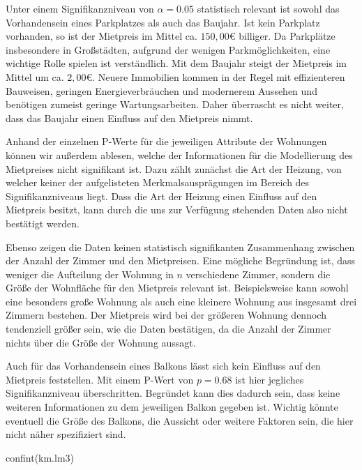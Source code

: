 \documentclass[
  a4paper,
  DIV=11]{scrartcl}
\newenvironment{Shaded}{\begin{snugshade}}{\end{snugshade}}
\newcommand{\FunctionTok}[1]{\textcolor[rgb]{0.28,0.35,0.67}{#1}}
\newcommand{\NormalTok}[1]{\textcolor[rgb]{0.00,0.23,0.31}{#1}}
\begin{document}
Unter einem Signifikanzniveau von \(\alpha = 0.05\) statistisch relevant
ist sowohl das Vorhandensein eines Parkplatzes als auch das Baujahr. Ist
kein Parkplatz vorhanden, so ist der Mietpreis im Mittel ca. \(150,00€\)
billiger. Da Parkplätze insbesondere in Großstädten, aufgrund der
wenigen Parkmöglichkeiten, eine wichtige Rolle spielen ist verständlich.
Mit dem Baujahr steigt der Mietpreis im Mittel um ca. \(2,00€\). Neuere
Immobilien kommen in der Regel mit effizienteren Bauweisen, geringen
Energieverbräuchen und modernerem Aussehen und benötigen zumeist geringe
Wartungsarbeiten. Daher überrascht es nicht weiter, dass das Baujahr
einen Einfluss auf den Mietpreis nimmt.

Anhand der einzelnen P-Werte für die jeweiligen Attribute der Wohnungen
können wir außerdem ablesen, welche der Informationen für die
Modellierung des Mietpreises nicht signifikant ist. Dazu zählt zunächst
die Art der Heizung, von welcher keiner der aufgelisteten
Merkmalsausprägungen im Bereich des Signifikanzniveaus liegt. Dass die
Art der Heizung einen Einfluss auf den Mietpreis besitzt, kann durch die
uns zur Verfügung stehenden Daten also nicht bestätigt werden.

Ebenso zeigen die Daten keinen statistisch signifikanten Zusammenhang
zwischen der Anzahl der Zimmer und den Mietpreisen. Eine mögliche
Begründung ist, dass weniger die Aufteilung der Wohnung in \(n\)
verschiedene Zimmer, sondern die Größe der Wohnfläche für den Mietpreis
relevant ist. Beispielsweise kann sowohl eine besonders große Wohnung
als auch eine kleinere Wohnung aus insgesamt drei Zimmern bestehen. Der
Mietpreis wird bei der größeren Wohnung dennoch tendenziell größer sein,
wie die Daten bestätigen, da die Anzahl der Zimmer nichts über die Größe
der Wohnung aussagt.

Auch für das Vorhandensein eines Balkons lässt sich kein Einfluss auf
den Mietpreis feststellen. Mit einem P-Wert von \(p = 0.68\) ist hier
jegliches Signifikanzniveau überschritten. Begründet kann dies dadurch
sein, dass keine weiteren Informationen zu dem jeweiligen Balkon gegeben
ist. Wichtig könnte eventuell die Größe des Balkons, die Aussicht oder
weitere Faktoren sein, die hier nicht näher spezifiziert sind.

\begin{Shaded}
\begin{Highlighting}[]
\FunctionTok{confint}\NormalTok{(km.lm3)}
\end{Highlighting}
\end{Shaded}
\end{document}
